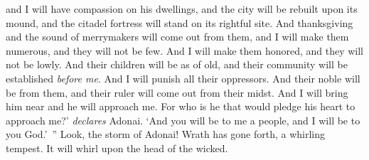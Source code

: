 \begin{biblechapter}
and I will have compassion on his dwellings, 
and the city will be rebuilt upon its mound, 
and the citadel fortress will stand on its rightful site.
\verse And thanksgiving and the sound of merrymakers 
will come out from them, 
and I will make them numerous, 
and they will not be few. 
And I will make them honored, 
and they will not be lowly.
\verse And their children will be as of old, 
and their community will be established \textit{before me}. 
And I will punish all their oppressors.
\verse And their noble will be from them, 
and their ruler will come out from their midst. 
And I will bring him near and he will approach me. 
For who is he that would pledge his heart to approach me?’ \textit{declares} Adonai.
\verse ‘And you will be to me a people, 
and I will be to you God.’ ”
\verse Look, the storm of Adonai! 
Wrath has gone forth, 
a whirling tempest. 
It will whirl upon the head of the wicked.
\end{biblechapter}

